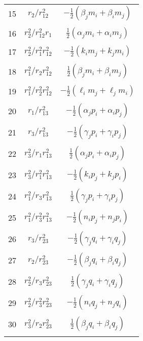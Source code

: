 \documentclass[Dissertation.tex]{subfiles}
\begin{document}
\begin{center}
\begin{longtable}{|c|c|c|}
15  & $r_2/r_{12}^2$  & $-\frac{1}{2} (\beta_j m_i + \beta_i m_j)$ \\
&  &  \\
16  & $r_2^2/r_{12}^2 r_1$  & $\frac{1}{2} (\alpha_j m_i + \alpha_i m_j)$ \\
&  &  \\
17  & $r_2^2/r_1^2 r_{12}^2$  & $ -\frac{1}{2} (k_i m_j + k_j m_i)$ \\
&  &  \\
18  & $r_1^2/r_2 r_{12}^2$  & $\frac{1}{2} (\beta_j m_i + \beta_i m_j)$ \\
&  &  \\
19  & $r_1^2/r_2^2 r_{12}^2$  & $ -\frac{1}{2} (\ell_i m_j + \ell_j m_i)$ \\
&  &  \\
20  & $r_1/r_{13}^2$  & $-\frac{1}{2} (\alpha_j p_i + \alpha_i p_j)$ \\
&  &  \\
21  & $r_3/r_{13}^2$  & $-\frac{1}{2} (\gamma_j p_i + \gamma_i p_j)$ \\
&  &  \\
22  & $r_3^2/r_1 r_{13}^2$  & $\frac{1}{2} (\alpha_j p_i + \alpha_i p_j)$ \\
&  &  \\
23  & $r_3^2/r_1^2 r_{13}^2$  & $ -\frac{1}{2} (k_i p_j + k_j p_i) $ \\
&  &  \\
24  & $r_1^2/r_3 r_{13}^2$  & $\frac{1}{2} (\gamma_j p_i + \gamma_i p_j)$ \\
&  &  \\
25  & $r_1^2/r_3^2 r_{13}^2$  & $  -\frac{1}{2} (n_i p_j + n_j p_i)$ \\
&  &  \\
26  & $r_3/r_{23}^2$  & $-\frac{1}{2} (\gamma_j q_i + \gamma_i q_j)$ \\
&  &  \\
27  & $r_2/r_{23}^2$  & $-\frac{1}{2} (\beta_j q_i + \beta_i q_j)$ \\
&  &  \\
28  & $r_2^2/r_3 r_{23}^2$  & $\frac{1}{2} (\gamma_j q_i + \gamma_i q_j)$ \\
&  &  \\
29  & $r_2^2/r_3^2 r_{23}^2$  & $-\frac{1}{2} (n_i q_j + n_j q_i)   $ \\
&  &  \\
30  & $r_3^2/r_2 r_{23}^2$  & $\frac{1}{2} (\beta_j q_i + \beta_i q_j)$ \\
&  &  \\

\end{longtable}
\end{center}
\end{document}
